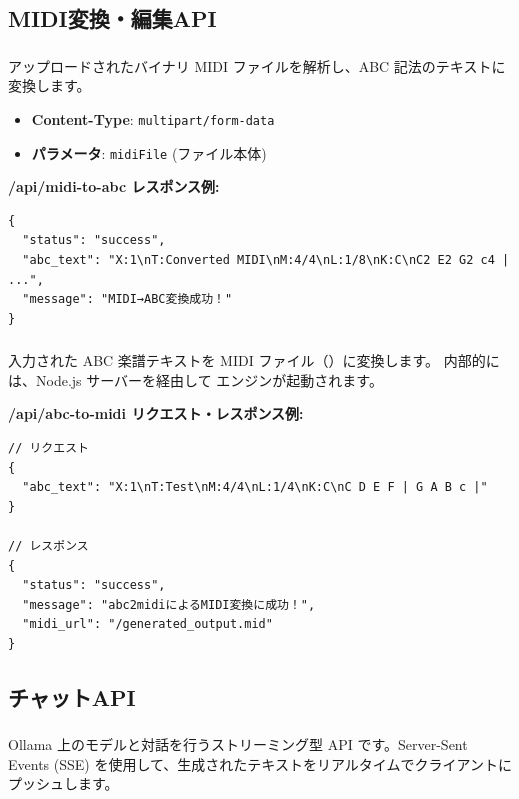 \subsection{MIDI変換・編集API}

\subsubsection{\texorpdfstring{}{POST /api/midi-to-abc}}
アップロードされたバイナリ MIDI ファイルを解析し、ABC 記法のテキストに変換します。

\begin{itemize}
  \item \textbf{Content-Type}: \texttt{multipart/form-data}
  \item \textbf{パラメータ}: \texttt{midiFile} (ファイル本体)
\end{itemize}

\textbf{/api/midi-to-abc レスポンス例:}\\
\begin{lstlisting}
{
  "status": "success",
  "abc_text": "X:1\nT:Converted MIDI\nM:4/4\nL:1/8\nK:C\nC2 E2 G2 c4 | ...",
  "message": "MIDI→ABC変換成功！"
}
\end{lstlisting}

\subsubsection{\texorpdfstring{}{POST /api/abc-to-midi}}
入力された ABC 楽譜テキストを MIDI ファイル（）に変換します。
内部的には、Node.js サーバーを経由して  エンジンが起動されます。

\textbf{/api/abc-to-midi リクエスト・レスポンス例:}\\
\begin{lstlisting}
// リクエスト
{
  "abc_text": "X:1\nT:Test\nM:4/4\nL:1/4\nK:C\nC D E F | G A B c |"
}

// レスポンス
{
  "status": "success",
  "message": "abc2midiによるMIDI変換に成功！",
  "midi_url": "/generated_output.mid"
}
\end{lstlisting}

\subsection{チャットAPI}

\subsubsection{\texorpdfstring{}{POST /api/chat}}
Ollama 上のモデルと対話を行うストリーミング型 API です。Server-Sent Events (SSE) を使用して、生成されたテキストをリアルタイムでクライアントにプッシュします。

